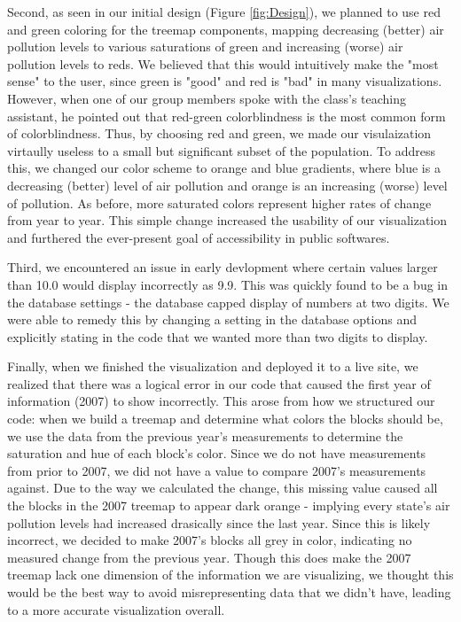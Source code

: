 \documentclass[journal]{vgtc}                %
\begin{document}
Second, as seen in our initial design (Figure \ref{fig:Design}), we planned to use red and green coloring for the treemap components, mapping
decreasing (better) air pollution levels to various saturations of green and increasing (worse) air pollution levels to reds. We believed
that this would intuitively make the "most sense" to the user, since green is "good" and red is "bad" in many visualizations. However, when
one of our group members spoke with the class's teaching assistant, he pointed out that red-green colorblindness is the most common form of
colorblindness. Thus, by choosing red and green, we made our visulaization virtaully useless to a small but significant subset of the population.
To address this, we changed our color scheme to orange and blue gradients, where blue is a decreasing (better) level of air pollution and orange
is an increasing (worse) level of pollution. As before, more saturated colors represent higher rates of change from year to year. This simple change
increased the usability of our visualization and furthered the ever-present goal of accessibility in public softwares.

Third, we encountered an issue in early devlopment where certain values larger than 10.0 would display incorrectly as 9.9. This was quickly
found to be a bug in the database settings - the database capped display of numbers at two digits. We were able to remedy this by changing 
a setting in the database options and explicitly stating in the code that we wanted more than two digits to display. 

Finally, when we finished the visualization and deployed it to a live site, we realized that there was a logical error in our code
that caused the first year of information (2007) to show incorrectly. This arose from how we structured our code: when we build a 
treemap and determine what colors the blocks should be, we use the data from the previous year's measurements to determine the saturation
and hue of each block's color. Since we do not have measurements from prior to 2007, we did not have a value to compare 2007's measurements
against. Due to the way we calculated the change, this missing value caused all the blocks in the 2007 treemap to appear dark orange - implying
every state's air pollution levels had increased drasically since the last year. Since this is likely incorrect, we decided to make 2007's blocks
all grey in color, indicating no measured change from the previous year. Though this does make the 2007 treemap lack one dimension of the information
we are visualizing, we thought this would be the best way to avoid misrepresenting data that we didn't have, leading to a more accurate
visualization overall.
\end{document}
